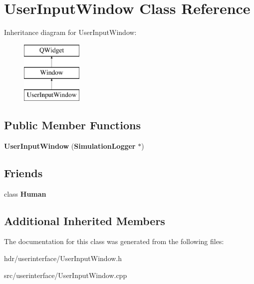 \section{User\-Input\-Window Class Reference}
\label{class_user_input_window}
Inheritance diagram for User\-Input\-Window\-:\begin{figure}[H]
\begin{center}
\leavevmode
\includegraphics[height=3.000000cm]{class_user_input_window}
\end{center}
\end{figure}
\subsection*{Public Member Functions}
\begin{DoxyCompactItemize}
\item 
{\bfseries User\-Input\-Window} ({\bf Simulation\-Logger} $\ast$)\label{class_user_input_window_ac4019208dfa2f1a3950173fda0611792}

\end{DoxyCompactItemize}
\subsection*{Friends}
\begin{DoxyCompactItemize}
\item 
class {\bfseries Human}\label{class_user_input_window_aa028043847be08771446e72e91baa53d}

\end{DoxyCompactItemize}
\subsection*{Additional Inherited Members}


The documentation for this class was generated from the following files\-:\begin{DoxyCompactItemize}
\item 
hdr/userinterface/User\-Input\-Window.\-h\item 
src/userinterface/User\-Input\-Window.\-cpp\end{DoxyCompactItemize}
